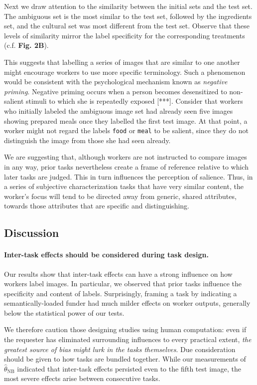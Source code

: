 \documentclass[a4paper]{report}
\begin{document}
Next we draw attention to the similarity between the initial sets and the test 
set.  The ambiguous set is the most similar to the test set, followed by the
ingredients set, and the cultural set was most different from the test set.
Observe that these levels of similarity mirror the label specificity for the 
corresponding treatments (c.f. \textbf{Fig. 2B}).  

This suggests that labelling a series of images that are similar to 
one another might encourage workers to use more specific terminology.
Such a phenomenon would be consistent with the psychological mechanism known 
as \textit{negative priming}.  Negative priming occurs when a person becomes 
desensitized to non-salient stimuli to which she is repeatedly 
exposed [***].  Consider that workers who initially 
labeled the ambiguous image set had already seen five images showing 
prepared meals once they labelled the first test image.  At that point,
a worker might not regard the labels \texttt{food} or \texttt{meal} to be 
salient, since they do not distinguish the image from those she had seen 
already.

We are suggesting that, although workers are not instructed to compare
images in any way, prior tasks nevertheless create a frame of reference
relative to which later tasks are judged.  This in turn 
influences the perception of salience. Thus, in a series of subjective 
characterization tasks that have very similar content, the worker's focus 
will tend to be directed away from generic, shared attributes, towards those 
attributes that are specific and distinguishing.


\subsection*{Discussion}

\paragraph{Inter-task effects should be considered during task design.}  
Our results show that inter-task effects can have a strong influence on how
workers label images.  In particular, we observed that prior tasks influence
the specificity and content of labels.  Surprisingly, framing a task by 
indicating a semantically-loaded funder had much milder effects on worker 
outputs, generally below the statistical power of our tests.

We therefore caution those designing studies using human computation: even if 
the requester has eliminated surrounding influences to every practical extent, 
\textit{the greatest source of bias might lurk in the tasks themselves}.
Due consideration should be given to how tasks are bundled together.
While our measurements of $\hat{\theta}_\text{NB}$ indicated that inter-task 
effects persisted even to the fifth test image, the most severe effects arise 
between consecutive tasks.
\end{document}
